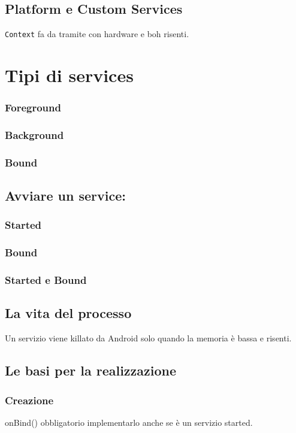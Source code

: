 \subsection{Platform e Custom Services}
\par \texttt{Context} fa da tramite con hardware e boh risenti.

\section{Tipi di services}
\subsubsection{Foreground}
\subsubsection{Background}
\subsubsection{Bound}

\subsection{Avviare un service:}
\subsubsection{Started}
\subsubsection{Bound}
\subsubsection{Started e Bound}

\subsection{La vita del processo}
\par Un servizio viene killato da Android solo quando la memoria è bassa e risenti.

\subsection{Le basi per la realizzazione}
\subsubsection{Creazione}
\par onBind() obbligatorio implementarlo anche se è un servizio started.

